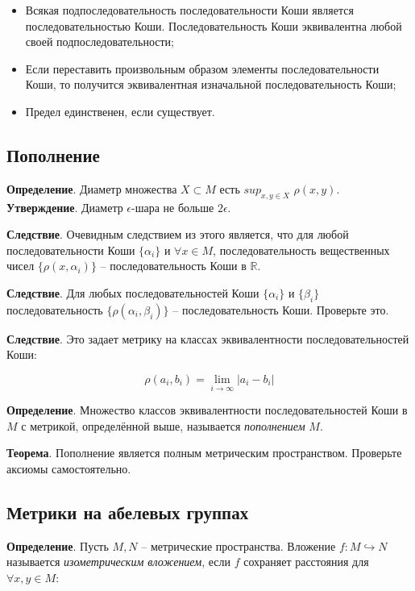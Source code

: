\documentclass[a4paper]{book}
\begin{document}
\begin{itemize}
	\item Всякая подпоследовательность последовательности Коши является последовательностью Коши. Последовательность Коши эквивалентна любой своей подпоследовательности; 
	\item Если переставить произвольным образом элементы последовательности Коши, то получится эквивалентная изначальной последовательность Коши;
	\item Предел единственен, если существует. 
\end{itemize}

\subsection{Пополнение}

\textbf{Определение}. Диаметр множества $X\subset M$ есть $sup_{x,y\in X}$ $\rho(x,y)$.
\\
\textbf{Утверждение}. Диаметр $\epsilon$-шара не больше $2\epsilon$.

\textbf{Следствие}. Очевидным следствием из этого является, что для любой последовательности Коши $\{\alpha_i\}$ и $\forall x\in M$, последовательность вещественных чисел $\{\rho(x,\alpha_i)\}$ -- последовательность Коши в $\mathbb{R}$. 

\textbf{Следствие}. Для любых последовательностей Коши $\{\alpha_i\}$ и $\{\beta_i\}$ последовательность $\{\rho(\alpha_i,\beta_i)\}$ -- последовательность Коши. Проверьте это. 

\textbf{Следствие}. Это задает метрику на классах эквивалентности последовательностей Коши: 

\begin{equation}
\rho(a_i,b_i) = \lim_{i\rightarrow\infty}| a_i - b_i |
\end{equation}

\textbf{Определение}. Множество классов эквивалентности последовательностей Коши в $M$ с метрикой, определённой выше, называется \textit{пополнением} $M$. 

\textbf{Теорема}. Пополнение является полным метрическим пространством. Проверьте аксиомы самостоятельно. 

\subsection{Метрики на абелевых группах}

\textbf{Определение}. Пусть $M,N$ -- метрические пространства. Вложение $f:M \hookrightarrow N$ называется \textit{изометрическим вложением}, если $f$ сохраняет расстояния для $\forall x,y\in M$: 
\end{document}
